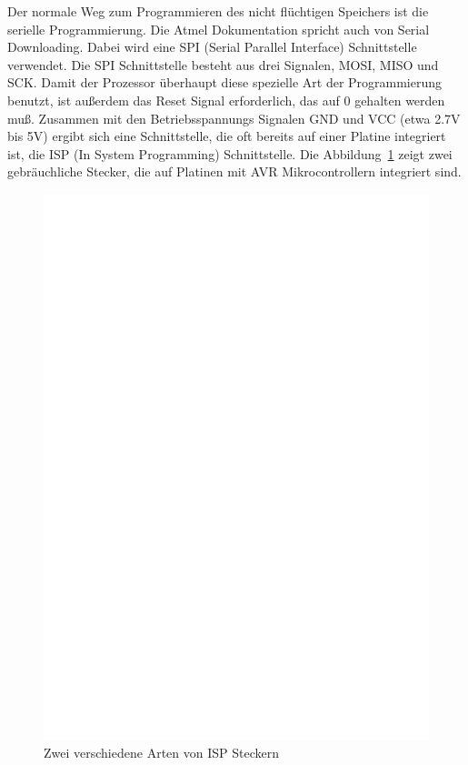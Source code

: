 Der normale Weg zum Programmieren des nicht flüchtigen Speichers ist die serielle Programmierung.
Die Atmel Dokumentation spricht auch von Serial Downloading. Dabei wird eine SPI (Serial Parallel Interface)
Schnittstelle verwendet.
Die SPI Schnittstelle besteht aus drei Signalen, MOSI, MISO und SCK.
Damit der Prozessor überhaupt diese spezielle Art der Programmierung benutzt, ist außerdem
das Reset Signal erforderlich, das auf 0 gehalten werden muß.
Zusammen mit den Betriebsspannungs Signalen GND und VCC (etwa 2.7V bis 5V) ergibt sich eine
Schnittstelle, die oft bereits auf einer Platine integriert ist, die ISP (In System Programming) 
Schnittstelle. Die Abbildung~\ref{fig:ISP} zeigt zwei gebräuchliche Stecker, die auf
Platinen mit AVR Mikrocontrollern integriert sind.

\begin{figure}[H]
\centering
\includegraphics[width=12cm]{../FIG/ISP.eps}
\caption{Zwei verschiedene Arten von ISP Steckern}
\label{fig:ISP}
\end{figure}

